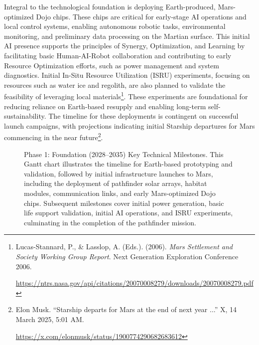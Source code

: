 \documentclass[fontsize=10pt, oneside, DIV=calc]{scrartcl}
\begin{document}
\noindent
Integral to the technological foundation is deploying Earth-produced, Mars-optimized Dojo chips. These chips are critical for early-stage AI operations and local control systems, enabling autonomous robotic tasks, environmental monitoring, and preliminary data processing on the Martian surface. This initial AI presence supports the principles of Synergy, Optimization, and Learning by facilitating basic Human-AI-Robot collaboration and contributing to early Resource Optimization efforts, such as power management and system diagnostics. Initial In-Situ Resource Utilization (ISRU) experiments, focusing on resources such as water ice and regolith, are also planned to validate the feasibility of leveraging local materials\footnote{Lucas-Stannard, P., \& Lasslop, A. (Eds.). (2006). \textit{Mars Settlement and Society Working Group Report}. Next Generation Exploration Conference 2006. 







\href{https://ntrs.nasa.gov/api/citations/20070008279/downloads/20070008279.pdf}\url{https://ntrs.nasa.gov/api/citations/20070008279/downloads/20070008279.pdf}}. These experiments are foundational for reducing reliance on Earth-based resupply and enabling long-term self-sustainability. The timeline for these deployments is contingent on successful launch campaigns, with projections indicating initial Starship departures for Mars commencing in the near future\footnote{Elon Musk. ``Starship departs for Mars at the end of next year ...'' X, 14 March 2025, 5:01 AM. 







\href{https://x.com/elonmusk/status/1900774290682683612}\url{https://x.com/elonmusk/status/1900774290682683612}}.

\medskip



\begin{figure}[H]
  \centering
  \noindent
  \begin{minipage}{\textwidth}
    \centering
    \caption{Phase 1: Foundation (2028–2035) Key Technical Milestones. This Gantt chart illustrates the timeline for Earth-based prototyping and validation, followed by initial infrastructure launches to Mars, including the deployment of pathfinder solar arrays, habitat modules, communication links, and early Mars-optimized Dojo chips. Subsequent milestones cover initial power generation, basic life support validation, initial AI operations, and ISRU experiments, culminating in the completion of the pathfinder mission.}
  \end{minipage}
\end{figure}
\end{document}
